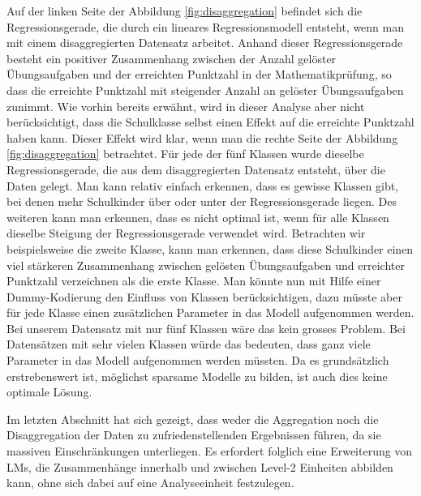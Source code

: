 \documentclass[12pt]{article}\usepackage[]{graphicx}\usepackage[]{color}
\begin{document}
Auf der linken Seite der Abbildung \ref{fig:disaggregation} befindet sich die Regressionsgerade, die durch ein lineares Regressionsmodell entsteht, wenn man mit einem disaggregierten Datensatz arbeitet. Anhand dieser Regressionsgerade besteht ein positiver Zusammenhang zwischen der Anzahl gelöster Übungsaufgaben und der erreichten Punktzahl in der Mathematikprüfung, so dass die erreichte Punktzahl mit steigender Anzahl an gelöster Übungsaufgaben zunimmt. Wie vorhin bereits erwähnt, wird in dieser Analyse aber nicht berücksichtigt, dass die Schulklasse selbst einen Effekt auf die erreichte Punktzahl haben kann. Dieser Effekt wird klar, wenn man die rechte Seite der Abbildung \ref{fig:disaggregation} betrachtet. Für jede der fünf Klassen wurde dieselbe Regressionsgerade, die aus dem disaggregierten Datensatz entsteht, über die Daten gelegt. Man kann relativ einfach erkennen, dass es gewisse Klassen gibt, bei denen mehr Schulkinder über oder unter der Regressionsgerade liegen. Des weiteren kann man erkennen, dass es nicht optimal ist, wenn für alle Klassen dieselbe Steigung der Regressionsgerade verwendet wird. Betrachten wir beispielsweise die zweite Klasse, kann man erkennen, dass diese Schulkinder einen viel stärkeren Zusammenhang zwischen gelösten Übungsaufgaben und erreichter Punktzahl verzeichnen als die erste Klasse. Man könnte nun mit Hilfe einer Dummy-Kodierung den Einfluss von Klassen berücksichtigen, dazu müsste aber für jede Klasse einen zusätzlichen Parameter in das Modell aufgenommen werden. Bei unserem Datensatz mit nur fünf Klassen wäre das kein grosses Problem. Bei Datensätzen mit sehr vielen Klassen würde das bedeuten, dass ganz viele Parameter in das Modell aufgenommen werden müssten. Da es grundsätzlich erstrebenswert ist, möglichst sparsame Modelle zu bilden, ist auch dies keine optimale Lösung. 

Im letzten Abschnitt hat sich gezeigt, dass weder die Aggregation noch die Disaggregation der Daten zu zufriedenstellenden Ergebnissen führen, da sie massiven Einschränkungen unterliegen. Es erfordert folglich eine Erweiterung von LMs, die Zusammenhänge innerhalb und zwischen Level-2 Einheiten abbilden kann, ohne sich dabei auf eine Analyseeinheit festzulegen.
\end{document}
